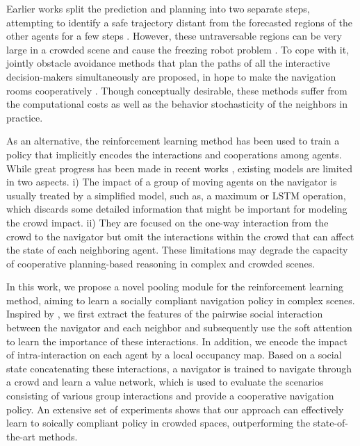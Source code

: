 \documentclass[letterpaper, 10 pt, conference]{ieeeconf}  %
\begin{document}
Earlier works split the prediction and planning into two separate steps, attempting to identify a safe trajectory distant from the forecasted regions of the other agents for a few steps \cite{bennewitz_learning_2005,aoude_probabilistically_2013}. However, these untraversable regions can be very large in a crowded scene and cause the freezing robot problem \cite{trautman_unfreezing_2010}. To cope with it, jointly obstacle avoidance methods that plan the paths of all the interactive decision-makers simultaneously are proposed, in hope to make the navigation rooms cooperatively \cite{trautman_unfreezing_2010}. Though conceptually desirable, these methods suffer from the computational costs as well as the behavior stochasticity of the neighbors in practice. 

As an alternative, the reinforcement learning method has been used to train a policy that implicitly encodes the interactions and cooperations among agents. While great progress has been made in recent works \cite{chen_decentralized_2016,chen_socially_2017,long_towards_2017,everett_motion_2018}, existing models are limited in two aspects. i) The impact of a group of moving agents on the navigator is usually treated by a simplified model, such as, a maximum or LSTM operation, which discards some detailed information that might be important for modeling the crowd impact. ii) They are focused on the one-way interaction from the crowd to the navigator but omit the interactions within the crowd that can affect the state of each neighboring agent. These limitations may degrade the capacity of cooperative planning-based reasoning in complex and crowded scenes. 

In this work, we propose a novel pooling module for the reinforcement learning method, aiming to learn a socially compliant navigation policy in complex scenes. Inspired by \cite{alahi_social_2016,gupta_social_2018,vemula_social_2017}, we first extract the features of the pairwise social interaction between the navigator and each neighbor and subsequently use the soft attention to learn the importance of these interactions. In addition, we encode the impact of intra-interaction on each agent by a local occupancy map. Based on a social state concatenating these interactions, a navigator is trained to navigate through a crowd and learn a value network, which is used to evaluate the scenarios consisting of various group interactions and provide a cooperative navigation policy. An extensive set of experiments shows that our approach can effectively learn to soically compliant policy in crowded spaces, outperforming the state-of-the-art methods. 
\end{document}
